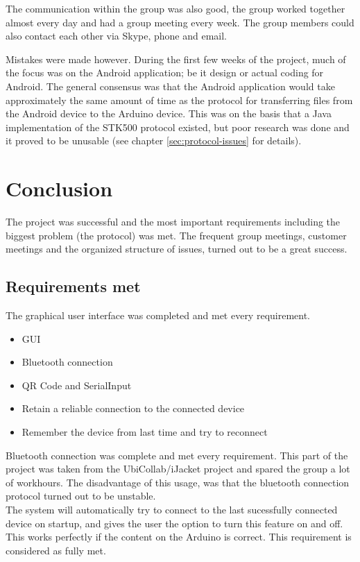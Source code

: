 	The communication within the group was also good, the group worked together almost every day and had a group meeting every week. The group members could also contact each other via Skype, phone and email.

	Mistakes were made however. During the first few weeks of the project, much of the focus was on the Android application; be it design or actual coding for Android. The general consensus was that the Android application would take approximately the same amount of time as the protocol for transferring files from the Android device to the Arduino device. This was on the basis that a Java implementation of the STK500 protocol existed, but poor research was done and it proved to be unusable (see chapter \ref{sec:protocol-issues} for details).


	\section{Conclusion}
    The project was successful and the most important requirements including the biggest problem (the protocol) was met. The frequent group meetings, customer meetings and the organized structure of issues, turned out to be a great success. \\

    	\subsection{Requirements met}
    		The graphical user interface was completed and met every requirement.\\

		\begin{itemize}
			\item{GUI}
			\item{Bluetooth connection}
			\item{QR Code and SerialInput}
			\item{Retain a reliable connection to the connected device}
			\item{Remember the device from last time and try to reconnect}
		\end{itemize}
    		Bluetooth connection was complete and met every requirement. This part of the project was taken from the UbiCollab/iJacket project and spared the group a lot of workhours. The disadvantage of this usage, was that the bluetooth connection protocol turned out to be unstable.\\

    		The system will automatically try to connect to the last sucessfully connected device on startup, and gives the user the option to turn this feature on and off. This works perfectly if the content on the Arduino is correct. This requirement is considered as fully met.\\

